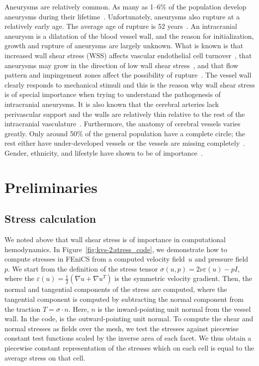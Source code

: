 Aneurysms are relatively common. As many as 1--6\% of the population
develop aneurysms during their
lifetime~\citep{Weir2002}. Unfortunately, aneurysms also rupture at a
relatively early age. The average age of rupture is 52
years~\citep{Humphrey2001}. An intracranial aneurysm is a dilatation of
the blood vessel wall, and the reason for initialization, growth and
rupture of aneurysms are largely unknown.  What is known is that
increased wall shear stress (WSS) affects vascular endothelial cell
turnover~\citep{DAVIESREMUZZIGORDONEtAl1986}, that aneurysms may grow
in the direction of low wall shear
stress~\citep{BousselRayzMcCullochEtAl2008}, and that flow pattern and
impingement zones affect the possibility of
rupture~\citep{CebralCastroBurgessEtAl2005}. The vessel wall clearly
responds to mechanical stimuli and this is the reason why wall shear
stress is of special importance when trying to understand the
pathogenesis of intracranial aneurysms. It is also known that the
cerebral arteries lack perivascular support and the walls are
relatively thin relative to the rest of the intracranial
vasculature~\citep{Humphrey2001,Stehbens1975}.  Furthermore, the
anatomy of cerebral vessels varies greatly. Only around 50\% of the
general population have a complete circle; the rest either have
under-developed vessels or the vessels are missing
completely~\citep{Fung1984}. Gender, ethnicity, and lifestyle have
shown to be of
importance~\citep{MhurchuAndersonJamrozikEtAl2001,LongstrethNelsonKoepsellEtAl1994,KongableLanzinoGermansonEtAl1996}.

\section{Preliminaries}

\subsection{Stress calculation}

We noted above that wall shear stress is of importance in
computational hemodynamics. In Figure~\ref{fig:kvs-2:stress_code}, we
demonstrate how to compute stresses in FEniCS from a computed velocity
field~$u$ and pressure field~$p$. We start from the definition of the
stress tensor $\sigma(u,p) = 2 \nu \varepsilon (u) - p I$, where the
$\varepsilon(u) = \frac{1}{2}(\nabla u + \nabla u^T)$ is the symmetric
velocity gradient. Then, the normal and tangential components of the
stress are computed, where the tangential component is computed by
subtracting the normal component from the traction $T = \sigma \cdot
n$. Here, $n$ is the inward-pointing unit normal from the vessel
wall. In the code,  is the outward-pointing unit normal. To
compute the shear and normal stresses as fields over the mesh, we test
the stresses against piecewise constant test functions scaled by the
inverse area of each facet. We thus obtain a piecewise constant
representation of the stresses which on each cell is equal to the
average stress on that cell.

